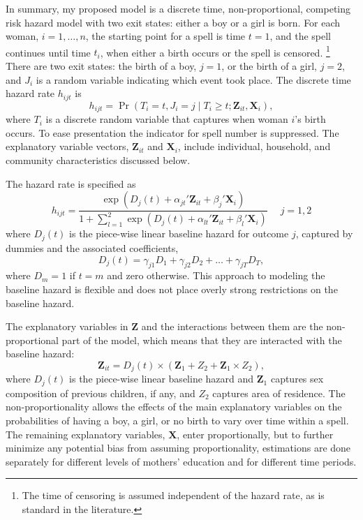 \documentclass[12pt,letterpaper]{article}
\begin{document}
In summary, my proposed model is a discrete time, non-proportional, competing risk 
hazard model with two exit states: either a boy or a girl is born.
For each woman, $i=1,\ldots,n$, the starting point for a spell is time $t=1$, and 
the spell continues until time $t_i$, when either a birth occurs or the spell 
is censored.%
\footnote{
The time of censoring is assumed independent of the hazard rate,
as is standard in the literature.
}
There are two exit states: the birth of a boy, $j=1$, or the birth of a girl, $j=2$, and 
$J_i$ is a random variable indicating which event took place.
The discrete time hazard rate $h_{ijt}$ is
\begin{equation}
 h_{ijt} = \Pr (T_i=t, J_i=j \mid T_i \geq t; \mathbf{Z}_{it},\mathbf{X}_{i} ),
\end{equation}
where $T_i$ is a discrete random variable that captures when woman $i$'s birth occurs.
To ease presentation the indicator for spell number is suppressed.
The explanatory variable vectors, $\mathbf{Z}_{it}$ and $\mathbf{X}_{i}$, include 
individual, household, and community characteristics discussed below.

The hazard rate is specified as
\begin{equation}
 h_{ijt} = \frac{\exp(D_j(t) + \alpha_{jt}'\mathbf{Z}_{it} + \beta_j'\mathbf{X}_{i})} 
 {1 + \sum_{l=1}^2 \exp(D_j(t) + \alpha_{lt}'\mathbf{Z}_{it} + \beta_l'\mathbf{X}_{i})} \: \: \; \; \;  j = 1,2
 \label{eq:hazard}
\end{equation}
where $D_{j}(t)$ is the piece-wise linear baseline hazard for outcome $j$, captured
by dummies and the associated coefficients,
\begin{equation}
D_j(t) = \gamma_{j1} D_1 + \gamma_{j2} D_2 + \ldots + \gamma_{jT} D_T,
\end{equation}
where $D_m = 1$ if $t=m$ and zero otherwise.
This approach to modeling the baseline hazard is flexible and does not place 
overly strong restrictions on the baseline hazard.

The explanatory variables in $\mathbf{Z}$ and the interactions between them 
are the non-proportional part of the model, which means that they are
interacted with the baseline hazard:
\begin{equation}
 \mathbf{Z}_{it} = D_j(t) \times (\mathbf{Z}_1 + Z_2 + \mathbf{Z}_1 \times Z_2),
\end{equation}
where $D_j(t)$ is the piece-wise linear baseline hazard and $\mathbf{Z}_1$ captures sex 
composition of previous children, if any, and $Z_2$ captures area of residence.
The non-proportionality allows the effects of the main explanatory variables on the probabilities 
of having a boy, a girl, or no birth to vary over time within a spell.
The remaining explanatory variables, $\mathbf{X}$, enter proportionally,
but to further minimize any potential bias from assuming proportionality, estimations 
are done separately for different levels of mothers' education and for different 
time periods.
\end{document}
